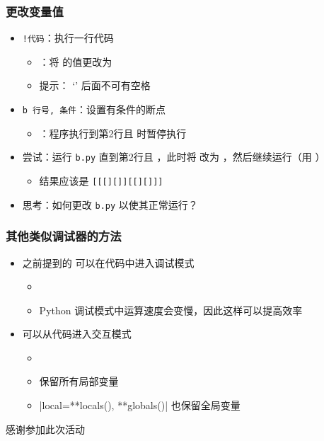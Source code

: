 \begin{frame} [fragile]
	\frametitle{更改变量值}
	\linespread{1.25}
	\begin{itemize}
	\item \texttt{!代码}：执行一行代码
		\begin{itemize}
		\item {}：将  的值更改为 
		\item 提示： `\inlinePython{!}' 后面不可有空格
		\end{itemize}
	\item \texttt{b 行号, 条件}：设置有条件的断点
		\begin{itemize}
		\item {}：程序执行到第2行且  时暂停执行
		\end{itemize}
	\item 尝试：运行 \texttt{b.py} 直到第2行且  ，此时将
				 改为  ，然后继续运行（用 
				 ）
		\begin{itemize}
		\item 结果应该是 \texttt{[[[][]][[][]]]}
		\end{itemize}
	\item 思考：如何更改 \texttt{b.py} 以使其正常运行？
	\end{itemize}
	\begin{comment}
	b 2, x == -3
	r
	p x			# -3
	!x = 0
	c
	\end{comment}
\end{frame}

\begin{frame} [fragile]
	\frametitle{其他类似调试器的方法}
	\linespread{1.5}
	\begin{itemize}
	\item 之前提到的  可以在代码中进入调试模式
		\begin{itemize}
		\item {}
		\item Python 调试模式中运算速度会变慢，因此这样可以提高效率
		\end{itemize}
	\item {} 可以从代码进入交互模式
		\begin{itemize}
		\item {}
		\item {} 保留所有局部变量
		\item \inlinePython|local={**locals(), **globals()}| 也保留全局变量
		\end{itemize}
	\end{itemize}
\end{frame}

\PreLastFrame
\begin{frame}
	\centerline{\fontsize{32}{32}\selectfont 感谢参加此次活动}
\end{frame}

\newpage



